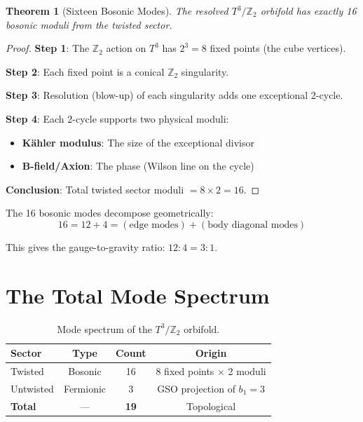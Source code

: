 \documentclass[12pt,a4paper]{article}
\newtheorem{theorem}{Theorem}[section]
\newcommand{\Ztwo}{\mathbb{Z}_2}
\newcommand{\Tthree}{T^3}
\begin{document}
\begin{theorem}[Sixteen Bosonic Modes]
\label{thm:sixteen}
The resolved $\Tthree/\Ztwo$ orbifold has exactly 16 bosonic moduli from the twisted sector.
\end{theorem}

\begin{proof}
\textbf{Step 1}: The $\Ztwo$ action on $\Tthree$ has $2^3 = 8$ fixed points (the cube vertices).

\textbf{Step 2}: Each fixed point is a conical $\Ztwo$ singularity.

\textbf{Step 3}: Resolution (blow-up) of each singularity adds one exceptional 2-cycle.

\textbf{Step 4}: Each 2-cycle supports two physical moduli:
\begin{itemize}
    \item \textbf{K\"ahler modulus}: The size of the exceptional divisor
    \item \textbf{B-field/Axion}: The phase (Wilson line on the cycle)
\end{itemize}

\textbf{Conclusion}: Total twisted sector moduli $= 8 \times 2 = 16$.
\end{proof}

The 16 bosonic modes decompose geometrically:
\begin{equation}
16 = 12 + 4 = (\text{edge modes}) + (\text{body diagonal modes})
\end{equation}

This gives the gauge-to-gravity ratio: $12:4 = 3:1$.

\section{The Total Mode Spectrum}
\label{sec:spectrum}

\begin{table}[H]
\centering
\begin{tabular}{lccc}
\toprule
\textbf{Sector} & \textbf{Type} & \textbf{Count} & \textbf{Origin} \\
\midrule
Twisted & Bosonic & 16 & 8 fixed points $\times$ 2 moduli \\
Untwisted & Fermionic & 3 & GSO projection of $b_1 = 3$ \\
\midrule
\textbf{Total} & --- & \textbf{19} & Topological \\
\bottomrule
\end{tabular}
\caption{Mode spectrum of the $\Tthree/\Ztwo$ orbifold.}
\label{tab:modes}
\end{table}
\end{document}
